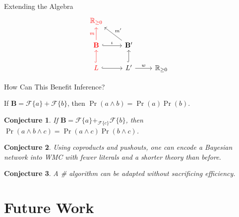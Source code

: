 \documentclass{beamer}
\newtheorem{conjecture}{Conjecture}
\begin{document}
\begin{frame}[fragile]{Extending the Algebra}
  \[
    \begin{tikzcd}
      \textcolor{red}{\mathbb{R}_{\ge 0}} & & \\
      \textcolor{red}{\mathbf{B}} \arrow[red]{u}{m} \ar[r,hookrightarrow,"\iota"]
      & \mathbf{B'} \arrow{lu}[swap]{m'} & \\
      \textcolor{red}{L} \ar[u,red,hookrightarrow] \ar[r,hookrightarrow] & L'
      \ar[u,hookrightarrow] \arrow{r}{w} & \mathbb{R}_{\ge 0}
    \end{tikzcd}
  \]
\end{frame}

\begin{frame}{How Can This Benefit Inference?}
  \begin{theorem}
    If $\mathbf{B} = \mathcal{F}\{a\} + \mathcal{F}\{b\}$, then $\Pr(a \land b) =
    \Pr(a)\Pr(b)$.
  \end{theorem}
  \pause
  \begin{conjecture}
    If $\mathbf{B} = \mathcal{F}\{a\} +_{\mathcal{F}\{c\}} \mathcal{F}\{b\}$, then $\Pr(a
    \land b \land c) = \Pr(a \land c)\Pr(b \land c)$.
  \end{conjecture}
  \pause
  \begin{conjecture}
    Using coproducts and pushouts, one can encode a Bayesian network into WMC
    with \alert{fewer literals} and a \alert{shorter theory} than before.
  \end{conjecture}
  \pause
  \begin{conjecture}
    A \#\SAT{} algorithm can be adapted without sacrificing efficiency.
  \end{conjecture}
\end{frame}

\section{Future Work}
\end{document}
